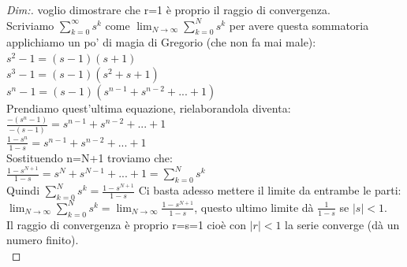 \begin{proof}[Dim:] voglio dimostrare che r=1 è proprio il raggio di convergenza.\\
	Scriviamo $\sum_{k=0}^\infty s^{k} $ come $ \lim_{N \to \infty} \sum_{k=0}^N s^{k} $ per avere questa sommatoria applichiamo un po' di magia di Gregorio (che non fa mai male):\\
	
	$ s^2 -1 = (s-1)(s+1)$\\
	$ s^3 -1 = (s-1)(s^2+s+1 )$\\
	$ s^n -1 = (s-1)(s^{n-1}+ s^{n-2}+...+1)$\\
	Prendiamo quest'ultima equazione, rielaborandola diventa:\\
	$ \frac{ -(s^n -1) }{-(s-1) } = s^{n-1}+ s^{n-2}+...+1$\\
	$ \frac{ 1-s^n }{ 1-s } = s^{n-1}+ s^{n-2}+...+1$\\
	Sostituendo n=N+1 troviamo che:\\
	$ \frac{ 1-s^{N+1} }{ 1-s } = s^N+ s^{N-1}+...+1 = \sum_{k=0}^N s^{k}$\\
	Quindi $ \sum_{k=0}^N s^{k} = \frac{ 1-s^{N+1} }{ 1-s } $
	Ci basta adesso mettere il limite da entrambe le parti:\\
	 $\lim_{N \to \infty} \sum_{k=0}^N s^{k} = \lim_{N \to \infty} \frac{ 1-s^{N+1} }{ 1-s } $, questo ultimo limite dà $ \frac{1}{1-s} $ se $ |s|<1$.\\
	
	Il raggio di convergenza è proprio r=s=1 cioè con $ |r| < 1$ la serie converge (dà un numero finito).\\
	
\end{proof}

